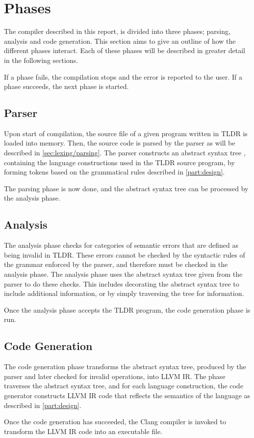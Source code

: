 \section{Phases}

The compiler described in this report, is divided into three phases; parsing, analysis and code generation. This section aims to give an outline of how the different phases interact. Each of these phases will be described in greater detail in the following sections.

If a phase fails, the compilation stops and the error is reported to the user. If a phase succeeds, the next phase is started.

\subsection{Parser}

Upon start of compilation, the source file of a given program written in TLDR is loaded into memory. Then, the source code is parsed by the parser as will be described in \cref{sec:lexing/parsing}. The parser constructs an abstract syntax tree \cite{fisher}, containing the language constructions used in the TLDR source program, by forming tokens based on the grammatical rules described in \cref{part:design}.

The parsing phase is now done, and the abstract syntax tree can be processed by the analysis phase.

\subsection{Analysis}

The analysis phase checks for categories of semantic errors that are defined as being invalid in TLDR. These errors cannot be checked by the syntactic rules of the grammar enforced by the parser, and therefore must be checked in the analysis phase. The analysis phase uses the abstract syntax tree given from the parser to do these checks. This includes decorating the abstract syntax tree to include additional information, or by simply traversing the tree for information.

Once the analysis phase accepts the TLDR program, the code generation phase is run.

\subsection{Code Generation}

The code generation phase transforms the abstract syntax tree, produced by the parser and later checked for invalid operations, into LLVM IR. The phase traverses the abstract syntax tree, and for each language construction, the code generator constructs LLVM IR code that reflects the semantics of the language as described in \cref{part:design}.

Once the code generation has succeeded, the Clang compiler is invoked to transform the LLVM IR code into an executable file.
